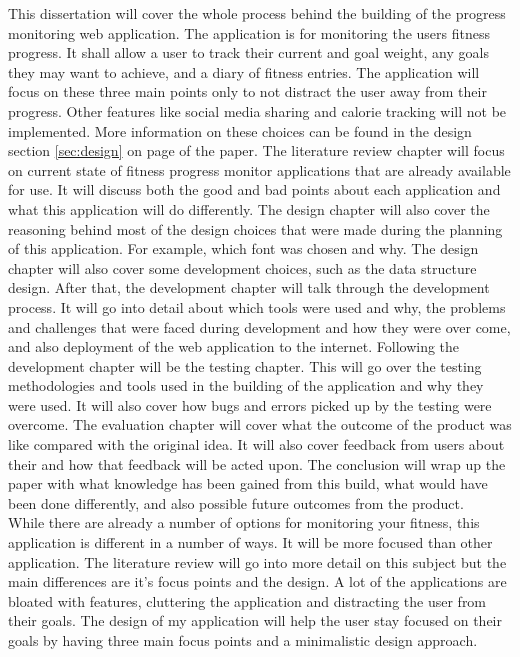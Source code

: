 This dissertation will cover the whole process behind the building of the progress monitoring web application. The application is for monitoring the users fitness progress. It shall allow a user to track their current and goal weight, any goals they may want to achieve, and a diary of fitness entries. The application will focus on these three main points only to not distract the user away from their progress. Other features like social media sharing and calorie tracking will not be implemented. More information on these choices can be found in the design section \ref{sec:design} on page \pageref{sec:design} of the paper. The literature review chapter will focus on current state of fitness progress monitor applications that are already available for use. It will discuss both the good and bad points about each application and what this application will do differently. The design chapter will also cover the reasoning behind most of the design choices that were made during the planning of this application. For example, which font was chosen and why. The design chapter will also cover some development choices, such as the data structure design. After that, the development chapter will talk through the development process. It will go into detail about which tools were used and why, the problems and challenges that were faced during development and how they were over come, and also deployment of the web application to the internet. Following the development chapter will be the testing chapter. This will go over the testing methodologies and tools used in the building of the application and why they were used. It will also cover how bugs and errors picked up by the testing were overcome. The evaluation chapter will cover what the outcome of the product was like compared with the original idea. It will also cover feedback from users about their and how that feedback will be acted upon. The conclusion will wrap up the paper with what knowledge has been gained from this build, what would have been done differently, and also possible future outcomes from the product.\\

While there are already a number of options for monitoring your fitness, this application is different in a number of ways. It will be more focused than other application. The literature review will go into more detail on this subject but the main differences are it's focus points and the design. A lot of the applications are bloated with features, cluttering the application and distracting the user from their goals. The design of my application will help the user stay focused on their goals by having three main focus points and a minimalistic design approach.\\
